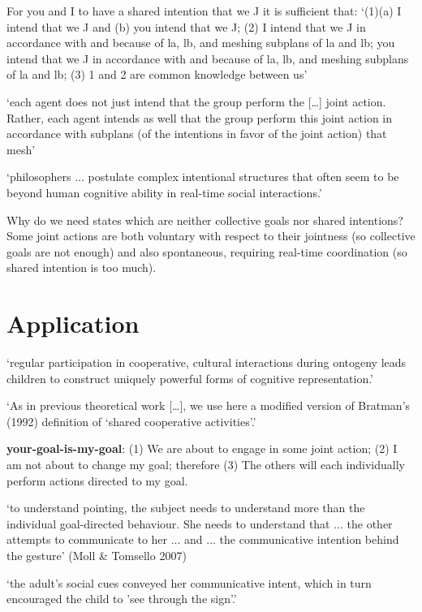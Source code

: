 \documentclass[12pt]{extarticle}
\begin{document}
\begin{multicols}{3}
For you and I to have a shared intention that we J it is sufficient that: `(1)(a) I intend that we J and (b) you intend that we J; (2) I intend that we J in accordance with and because of la, lb, and meshing subplans of la and lb; you intend that we J in accordance with and because of la, lb, and meshing subplans of la and lb; (3) 1 and 2 are common knowledge between us' \citep[View 4]{Bratman:1993je}


`each agent does not just intend that the group perform the […] joint action. Rather, each agent intends as well that the group perform this joint action in accordance with subplans (of the intentions in favor of the joint action) that mesh' \citep[p.\ 332]{Bratman:1992mi}

`philosophers ... postulate complex intentional structures that often seem to be beyond human cognitive ability in real-time social interactions.'
\citep[p.\ 2022]{Knoblich:2008hy}



Why do we need states which are neither collective goals nor shared intentions?  Some joint actions are both voluntary with respect to their jointness (so collective goals are not enough) and also spontaneous, requiring real-time coordination (so shared intention is too much).



\section{Application}
`regular participation in cooperative, cultural interactions during ontogeny leads children to construct uniquely powerful forms of cognitive representation.'
\citep[pp.\ 2-3]{Moll:2007gu}

`As in previous theoretical work […], we use here a modified version of Bratman’s (1992) definition of `shared cooperative activities'.' \citep[p.\ 3]{Moll:2007gu}


\textbf{your-goal-is-my-goal}: (1) We are about to engage in some joint action; (2) I am not about to change my goal; therefore (3) The others will each individually perform actions directed to my goal.


`to understand pointing, the subject needs to understand more than the individual goal-directed behaviour. She needs to understand that ... the other attempts to communicate to her ...  and ... the communicative intention behind the gesture'
(Moll \& Tomsello 2007)

`the adult’s social cues conveyed her communicative intent, which in turn encouraged the child to 'see through the sign'.'
\citep[p.\ 118]{leekam_adults_2010}

\footnotesize 


\end{multicols}
\end{document}
